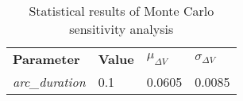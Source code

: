 
                \begin{table}[]
                \centering
                \begin{tabular}{l l l l}
                \rowcolor[HTML]{EFEFEF} \textbf{Parameter} & \textbf{Value} & \textbf{$\mu_{\Delta V}$} & \textbf{$\sigma_{\Delta V}$} \\
                \textit{arc\_duration} & 0.1 & 0.0605 & 0.0085 \\

                \end{tabular}
                \caption{Statistical results of Monte Carlo sensitivity analysis}
                \label{tab:SensitivityAnalysis}
                \end{table}
                